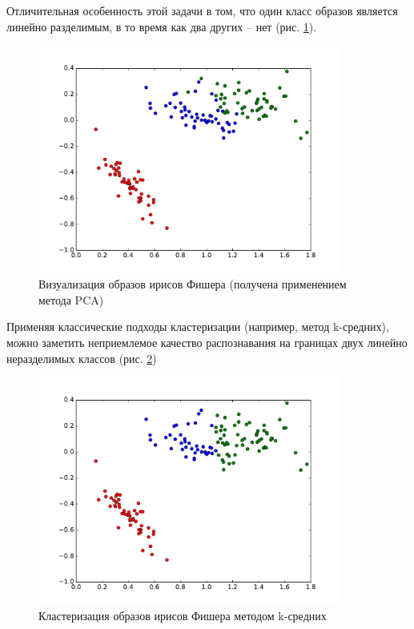Отличительная особенность этой задачи в том, что один класс образов является линейно разделимым, в то время как два других -- нет (рис. \ref{fig:irises_visualize}).

\begin{figure}[h]
	\begin{center}
		\includegraphics[width=10cm]{man-source/images/ch3/pic3-8.pdf}
		\caption{Визуализация образов ирисов Фишера (получена применением метода PCA)}				
		\label{fig:irises_visualize}
	\end{center}
\end{figure}

Применяя классические подходы кластеризации (например, метод k-средних), можно заметить неприемлемое качество распознавания на границах двух линейно неразделимых классов (рис. \ref{fig:kmeans})

\begin{figure}[h]
	\begin{center}
		\includegraphics[width=10cm]{man-source/images/ch3/pic3-9.pdf}
		\caption{Кластеризация образов ирисов Фишера методом k-средних}			
		\label{fig:kmeans}
	\end{center}
\end{figure}

